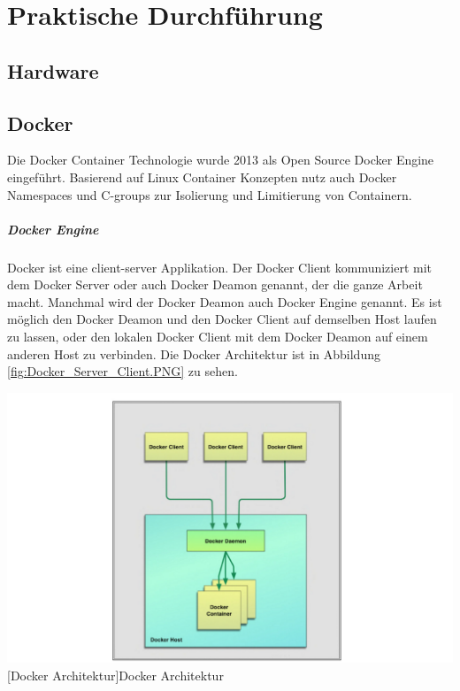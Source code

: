 \thispagestyle{empty}
\section{Praktische Durchführung}
\subsection{Hardware}


\pagebreak
\subsection{Docker}
Die Docker Container Technologie wurde 2013 als Open Source Docker Engine eingeführt. Basierend auf Linux Container Konzepten nutz auch Docker Namespaces und C-groups zur Isolierung und Limitierung von Containern.  

\subparagraph{Docker Engine}
Docker ist eine client-server Applikation. Der Docker Client kommuniziert mit dem Docker Server oder auch Docker Deamon genannt, der die ganze Arbeit macht. Manchmal wird der Docker Deamon auch Docker Engine genannt. Es ist möglich den Docker Deamon und den Docker Client auf demselben Host laufen zu lassen, oder den lokalen Docker Client mit dem Docker Deamon auf einem anderen Host zu verbinden. Die Docker Architektur ist in Abbildung \ref{fig:Docker_Server_Client.PNG} zu sehen\cite{Turnbull2015TheBook}.

\vspace{1em}
\begin{minipage}{\linewidth}
	\centering
	\includegraphics[width=1\linewidth]{pics/Docker_Server_Client.PNG}
	[Docker Architektur\cite{Turnbull2015TheBook}]{Docker Architektur}
	\label{fig:Docker_Server_Client.PNG}
\end{minipage}

